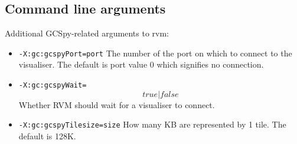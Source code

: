 \subsection{Command line arguments}

Additional GCSpy-related arguments to rvm:

\begin{itemize}
\item {\tt -X:gc:gcspyPort=port}
    The number of the port on which to connect to the visualiser.  The default is port value 0 which signifies no connection.
\item {\tt -X:gc:gcspyWait=\[true|false\]}
    Whether RVM should wait for a visualiser to connect.
\item {\tt -X:gc:gcspyTilesize=size}
    How many KB are represented by 1 tile.  The default is 128K.
\end{itemize}


